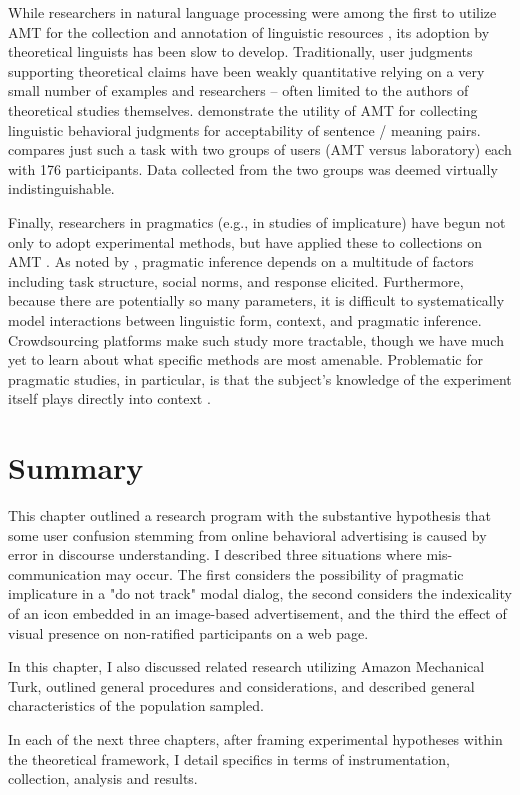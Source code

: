 \begin{sloppier}
While researchers in natural language processing were among the first to utilize AMT for the collection and annotation of linguistic resources \citep{CallisonBurch:2010vk}, its adoption by theoretical linguists has been slow to develop. Traditionally, user judgments supporting theoretical claims have been weakly quantitative relying on a very small number of examples and researchers -- often limited to the authors of theoretical studies themselves. \cite*{Gibson:2011wp} demonstrate the utility of AMT for collecting linguistic behavioral judgments for acceptability of sentence / meaning pairs. \cite{Sprouse:2010dx} compares just such a task with two groups of users (AMT versus laboratory) each with 176 participants. Data collected from the two groups was deemed virtually indistinguishable.
\end{sloppier}

Finally, researchers in pragmatics (e.g., in studies of implicature) have begun not only to adopt experimental methods, but have applied these to collections on AMT  \citep[for example,][]{Stiller:2011vz,Degen:tr,Bergen:2012up}.  As noted by  \cite*{Assessingthepragma:2011ug},  pragmatic inference depends on a multitude of factors including task structure, social norms, and response elicited. Furthermore, because there are potentially so many parameters, it is difficult to systematically model interactions between linguistic form, context, and pragmatic inference. Crowdsourcing platforms make such study more tractable, though we have much yet to learn about what specific methods are most amenable. Problematic for pragmatic studies, in particular, is that the subject's knowledge of the experiment itself plays directly into context  \citep{Rosnow:1976wy}. 

\section{Summary}
\label{summary}


\begin{sloppier}
This chapter outlined a research program with the substantive hypothesis that some user confusion stemming from online behavioral advertising is caused by error in discourse understanding. I described three situations where mis-communication may occur. The first considers the possibility of pragmatic implicature in a "do not track" modal dialog, the second considers the indexicality of an icon embedded in an image-based advertisement, and the third the effect of visual presence on non-ratified participants on a web page.
\end{sloppier}


In this chapter, I also discussed related research utilizing Amazon Mechanical Turk, outlined general procedures and considerations, and described general characteristics of the population sampled.

In each of the next three chapters, after framing experimental hypotheses within the theoretical framework, I detail specifics in terms of instrumentation, collection, analysis and results.
